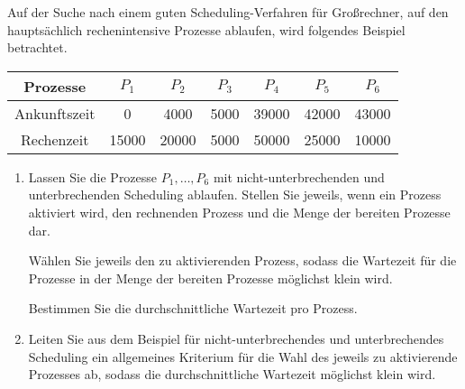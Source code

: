 \documentclass{uebungsblatt}
\begin{document}
\begin{aufgabe}
Auf der Suche nach einem guten Scheduling-Verfahren für Großrechner,
auf den hauptsächlich rechenintensive Prozesse ablaufen,
wird folgendes Beispiel betrachtet.

\medskip
\begin{center}
\begin{tabular}{|c||c|c|c|c|c|c|}

\hline



Prozesse&$P_1$&$P_2$&$P_3$&$P_4$&$P_5$&$P_6$\\
\hline
\hline 
Ankunftszeit &0    & 4000&5000&39000&42000&43000\\
\hline
Rechenzeit   &15000&20000&5000&50000&25000&10000\\
\hline
\end{tabular}
\end{center}

\medskip
\begin{enumerate}
\item
Lassen Sie die Prozesse $P_1, \ldots, P_6$
mit nicht-unterbrechenden und unterbrechenden Scheduling
ablaufen. Stellen Sie jeweils, wenn ein Prozess aktiviert wird,
den rechnenden Prozess und die Menge der bereiten Prozesse dar.

Wählen Sie jeweils den zu aktivierenden Prozess,
sodass die Wartezeit für die Prozesse in der Menge der bereiten Prozesse
möglichst klein wird. 

Bestimmen Sie die durchschnittliche Wartezeit pro Prozess.\\

\item
Leiten Sie aus dem Beispiel für nicht-unterbrechendes und unterbrechendes Scheduling
ein allgemeines Kriterium für die Wahl des jeweils zu aktivierende 
Prozesses ab, sodass die durchschnittliche Wartezeit möglichst klein wird.\\

\end{enumerate}
\end{aufgabe}
\end{document}
